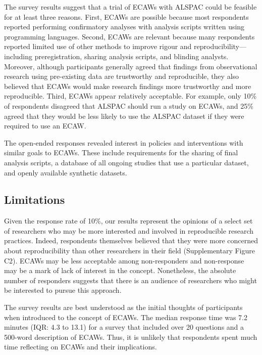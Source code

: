 \documentclass[
  man,floatsintext]{apa6}
\begin{document}
The survey results suggest that a trial of ECAWs with ALSPAC could be feasible for at least three reasons. First, ECAWs are possible because most respondents reported performing confirmatory analyses with analysis scripts written using programming languages. Second, ECAWs are relevant because many respondents reported limited use of other methods to improve rigour and reproducibility---including preregistration, sharing analysis scripts, and blinding analysts. Moreover, although participants generally agreed that findings from observational research using pre-existing data are trustworthy and reproducible, they also believed that ECAWs would make research findings more trustworthy and more reproducible. Third, ECAWs appear relatively acceptable. For example, only 10\% of respondents disagreed that ALSPAC should run a study on ECAWs, and 25\% agreed that they would be less likely to use the ALSPAC dataset if they were required to use an ECAW.

The open-ended responses revealed interest in policies and interventions with similar goals to ECAWs. These include requirements for the sharing of final analysis scripts, a database of all ongoing studies that use a particular dataset, and openly available synthetic datasets.

\hypertarget{limitations}{%
\subsection{Limitations}\label{limitations}}

Given the response rate of 10\%, our results represent the opinions of a select set of researchers who may be more interested and involved in reproducible research practices. Indeed, respondents themselves believed that they were more concerned about reproducibility than other researchers in their field (Supplementary Figure C2). ECAWs may be less acceptable among non-responders and non-response may be a mark of lack of interest in the concept. Nonetheless, the absolute number of responders suggests that there is an audience of researchers who might be interested to pursue this approach.

The survey results are best understood as the initial thoughts of participants when introduced to the concept of ECAWs. The median response time was 7.2 minutes (IQR: 4.3 to 13.1) for a survey that included over 20 questions and a 500-word description of ECAWs. Thus, it is unlikely that respondents spent much time reflecting on ECAWs and their implications.
\end{document}
